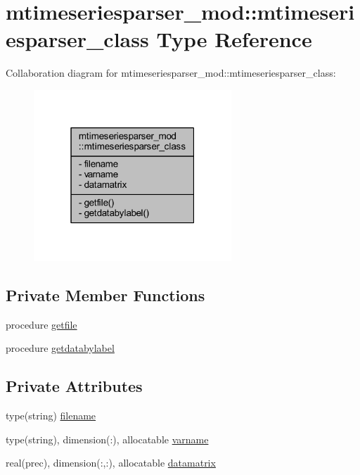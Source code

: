 \hypertarget{structmtimeseriesparser__mod_1_1mtimeseriesparser__class}{}\section{mtimeseriesparser\+\_\+mod\+:\+:mtimeseriesparser\+\_\+class Type Reference}
\label{structmtimeseriesparser__mod_1_1mtimeseriesparser__class}


Collaboration diagram for mtimeseriesparser\+\_\+mod\+:\+:mtimeseriesparser\+\_\+class\+:\nopagebreak
\begin{figure}[H]
\begin{center}
\leavevmode
\includegraphics[width=211pt]{structmtimeseriesparser__mod_1_1mtimeseriesparser__class__coll__graph}
\end{center}
\end{figure}
\subsection*{Private Member Functions}
\begin{DoxyCompactItemize}
\item 
procedure \mbox{\hyperlink{structmtimeseriesparser__mod_1_1mtimeseriesparser__class_ae908f2a3420dc8854883def159e0ab45}{getfile}}
\item 
procedure \mbox{\hyperlink{structmtimeseriesparser__mod_1_1mtimeseriesparser__class_ad777f538bd33588c740497413bb2c8f7}{getdatabylabel}}
\end{DoxyCompactItemize}
\subsection*{Private Attributes}
\begin{DoxyCompactItemize}
\item 
type(string) \mbox{\hyperlink{structmtimeseriesparser__mod_1_1mtimeseriesparser__class_afb3b0ab797713b6feb31b6a425f1b804}{filename}}
\item 
type(string), dimension(\+:), allocatable \mbox{\hyperlink{structmtimeseriesparser__mod_1_1mtimeseriesparser__class_a163c0d7ab75a303626ac7b73ed47e70c}{varname}}
\item 
real(prec), dimension(\+:,\+:), allocatable \mbox{\hyperlink{structmtimeseriesparser__mod_1_1mtimeseriesparser__class_a23110a3614b064eeee495cbd8e32af4d}{datamatrix}}
\end{DoxyCompactItemize}


